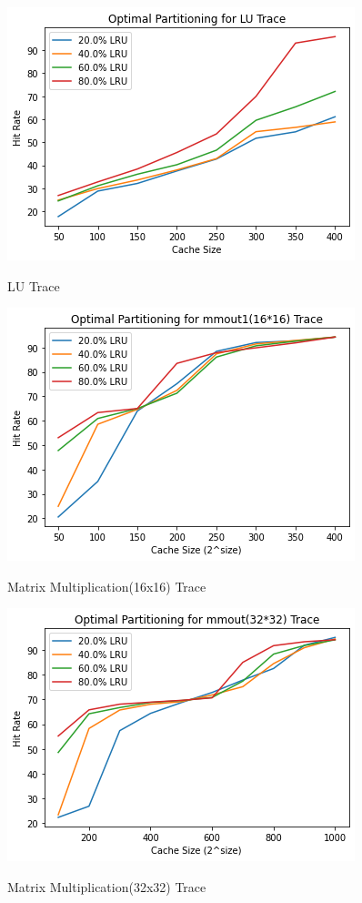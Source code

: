 \documentclass[conference]{IEEEtran}
\begin{document}
 \begin{figure}
        \centering
       \includegraphics[scale=0.6]{lu_partition.png}~
       \caption{LU Trace}\label{Fig:1}
 \end{figure}

 \begin{figure}
        \centering
       \includegraphics[scale=0.6]{mm16_partition.png}~
       \caption{Matrix Multiplication(16x16) Trace}\label{Fig:1}
 \end{figure}

 \begin{figure}
        \centering
       \includegraphics[scale=0.6]{mm32_partition.png}~
       \caption{Matrix Multiplication(32x32) Trace}\label{Fig:1}
 \end{figure}
\end{document}
